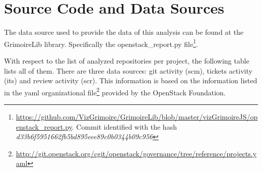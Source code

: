 \documentclass[a4wide,11pt]{report}
\begin{document}
\chapter{Source Code and Data Sources}
\label{chap:data_sources}

The data source used to provide the data of this analysis can be found at the GrimoireLib library. Specifically the openstack\_report.py file\footnote{\url{https://github.com/VizGrimoire/GrimoireLib/blob/master/vizGrimoireJS/openstack_report.py}. Commit identified with the hash \emph{d33b6f5951662fb5bd895eee89c0b0344b09c956}}. 


With respect to the list of analyzed repositories per project, the following table lists all of them.
There are three data sources: git activity (scm), tickets activity (its) and review activity (scr). This information is based on the information listed in the yaml organizational file\footnote{\url{http://git.openstack.org/cgit/openstack/governance/tree/reference/projects.yaml}} provided by the OpenStack Foundation.



\end{document}
